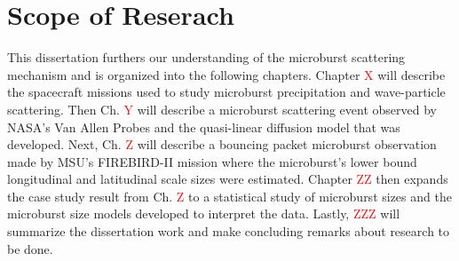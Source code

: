 \section{Scope of Reserach}\label{Intro:scope}
This dissertation furthers our understanding of the microburst scattering mechanism and is organized into the following chapters. Chapter \textcolor{red}{X} will describe the spacecraft missions used to study microburst precipitation and wave-particle scattering. Then Ch. \textcolor{red}{Y} will describe a microburst scattering event observed by NASA's Van Allen Probes and the quasi-linear diffusion model that was developed. Next, Ch. \textcolor{red}{Z} will describe a bouncing packet microburst observation made by MSU's FIREBIRD-II mission where the microburst's lower bound longitudinal and latitudinal scale sizes were estimated. Chapter \textcolor{red}{ZZ} then expands the case study result from Ch. \textcolor{red}{Z} to a statistical study of microburst sizes and the microburst size models developed to interpret the data. Lastly, \textcolor{red}{ZZZ} will summarize the dissertation work and make concluding remarks about research to be done.

\iffalse %
Welcome to the Montana State University electronic Thesis/Dissertation (ETD) \LaTeX{} template.  In this chapter various sections, subsections, and subsubsections are created and filled with random text).  In Ch.~\ref{CH:theory} methods to write equations and how to include figures and tables are explored. Conclusions are drawn in Ch.~\ref{conclusion}.


\section{Section}\label{Sect:test}
\lipsum[1] %

\subsection{Subsection}\label{Sect:testsub}
\lipsum[2] %

\subsubsection{Subsubsection}\label{Sect:testsubsub}
\lipsum[3] %

\longsubsection{Subsection With a Very Very Very Very}{Very Very Very Very Very Very Long Title}\label{Sect:longsub}
For long subsection titles use the command \verb|\longsubsection{#1}{#2}|, where \#1 is the first line of the long title, and \#2 is the second line of the long title. You can also pass an optional argument to this command that puts a shorter title in the table of contents as shown by the subsection below.

\longsubsection[Subsection With a Very Long Title]{Subsection With a Very Long Title}{But Shortened in the Table Of Contents}\label{Sect:longsub2}
There are \textbf{not} similar commands for sections and subsubsections as these are not specified in the MSU style guide.  
\fi
